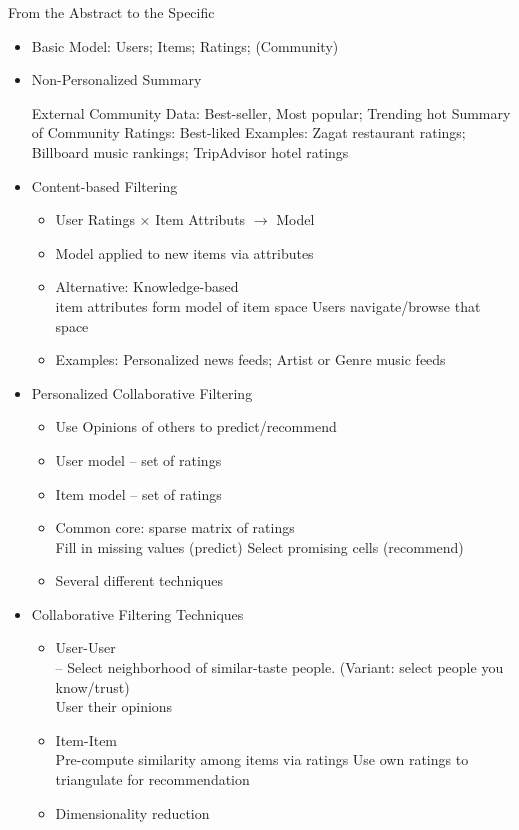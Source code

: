 \documentclass[fleqn,twoside]{article}
\begin{document}
From the Abstract to the Specific
\begin{itemize}
\item Basic Model:  Users; Items; Ratings; (Community)

\item Non-Personalized Summary 

External Community Data: Best-seller, Most popular; Trending hot
Summary of Community Ratings: Best-liked
Examples:
	Zagat restaurant ratings; 
	Billboard music rankings;
	TripAdvisor hotel ratings

\item Content-based Filtering
	\begin{itemize}
	\item User Ratings $\times$ Item Attributs $\rightarrow$ Model
	\item Model applied to new items via attributes
	\item Alternative:  Knowledge-based \\
	  item attributes form model of item space
	   Users navigate/browse that space
	\item Examples:
		Personalized news feeds; 
		Artist or Genre music feeds
	\end{itemize}
\item Personalized Collaborative Filtering
	\begin{itemize}
	\item Use Opinions of others to predict/recommend
	\item User model -- set of ratings
	\item Item model -- set of ratings
	\item Common core: sparse matrix of ratings\\
		Fill in missing values (predict)
		Select promising cells (recommend)
	\item Several different techniques
	\end{itemize}
\item Collaborative Filtering Techniques
	\begin{itemize}
	  \item User-User\\
		 -- Select neighborhood of similar-taste people. (Variant: select people you know/trust) \\
		User their opinions
	\item Item-Item \\
		Pre-compute similarity among items via ratings
		Use own ratings to triangulate for recommendation
	\item Dimensionality reduction \\

\end{itemize}
\end{itemize}
\end{document}
